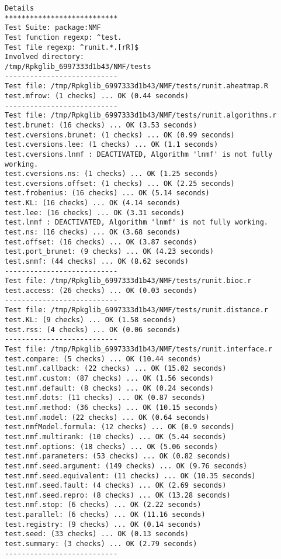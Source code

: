 \documentclass[10pt]{article}\usepackage[]{graphicx}\usepackage[]{color}
\begin{document}
\begin{verbatim}
Details 
*************************** 
Test Suite: package:NMF 
Test function regexp: ^test. 
Test file regexp: ^runit.*.[rR]$ 
Involved directory: 
/tmp/Rpkglib_6997333d1b43/NMF/tests 
--------------------------- 
Test file: /tmp/Rpkglib_6997333d1b43/NMF/tests/runit.aheatmap.R 
test.mfrow: (1 checks) ... OK (0.44 seconds)
--------------------------- 
Test file: /tmp/Rpkglib_6997333d1b43/NMF/tests/runit.algorithms.r 
test.brunet: (16 checks) ... OK (3.53 seconds)
test.cversions.brunet: (1 checks) ... OK (0.99 seconds)
test.cversions.lee: (1 checks) ... OK (1.1 seconds)
test.cversions.lnmf : DEACTIVATED, Algorithm 'lnmf' is not fully working.
test.cversions.ns: (1 checks) ... OK (1.25 seconds)
test.cversions.offset: (1 checks) ... OK (2.25 seconds)
test.frobenius: (16 checks) ... OK (5.14 seconds)
test.KL: (16 checks) ... OK (4.14 seconds)
test.lee: (16 checks) ... OK (3.31 seconds)
test.lnmf : DEACTIVATED, Algorithm 'lnmf' is not fully working.
test.ns: (16 checks) ... OK (3.68 seconds)
test.offset: (16 checks) ... OK (3.87 seconds)
test.port_brunet: (9 checks) ... OK (4.23 seconds)
test.snmf: (44 checks) ... OK (8.62 seconds)
--------------------------- 
Test file: /tmp/Rpkglib_6997333d1b43/NMF/tests/runit.bioc.r 
test.access: (26 checks) ... OK (0.03 seconds)
--------------------------- 
Test file: /tmp/Rpkglib_6997333d1b43/NMF/tests/runit.distance.r 
test.KL: (9 checks) ... OK (1.58 seconds)
test.rss: (4 checks) ... OK (0.06 seconds)
--------------------------- 
Test file: /tmp/Rpkglib_6997333d1b43/NMF/tests/runit.interface.r 
test.compare: (5 checks) ... OK (10.44 seconds)
test.nmf.callback: (22 checks) ... OK (15.02 seconds)
test.nmf.custom: (87 checks) ... OK (1.56 seconds)
test.nmf.default: (8 checks) ... OK (0.24 seconds)
test.nmf.dots: (11 checks) ... OK (0.87 seconds)
test.nmf.method: (36 checks) ... OK (10.15 seconds)
test.nmf.model: (22 checks) ... OK (0.64 seconds)
test.nmfModel.formula: (12 checks) ... OK (0.9 seconds)
test.nmf.multirank: (10 checks) ... OK (5.44 seconds)
test.nmf.options: (18 checks) ... OK (5.06 seconds)
test.nmf.parameters: (53 checks) ... OK (0.82 seconds)
test.nmf.seed.argument: (149 checks) ... OK (9.76 seconds)
test.nmf.seed.equivalent: (11 checks) ... OK (10.35 seconds)
test.nmf.seed.fault: (4 checks) ... OK (2.69 seconds)
test.nmf.seed.repro: (8 checks) ... OK (13.28 seconds)
test.nmf.stop: (6 checks) ... OK (2.22 seconds)
test.parallel: (6 checks) ... OK (11.16 seconds)
test.registry: (9 checks) ... OK (0.14 seconds)
test.seed: (33 checks) ... OK (0.13 seconds)
test.summary: (3 checks) ... OK (2.79 seconds)
--------------------------- 

\end{verbatim}
\end{document}
